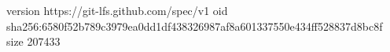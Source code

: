 version https://git-lfs.github.com/spec/v1
oid sha256:6580f52b789c3979ea0dd1df438326987af8a601337550e434ff528837d8bc8f
size 207433
